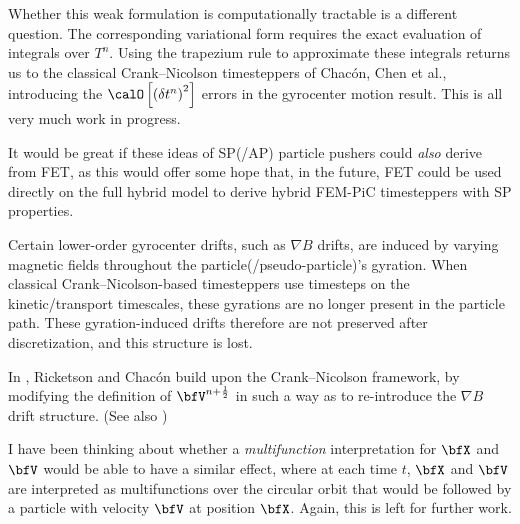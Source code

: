 \begin{remark}
        Whether this weak formulation is computationally tractable is a different question. The corresponding variational form requires the exact evaluation of integrals over $T^{n}$. Using the trapezium rule to approximate these integrals returns us to the classical Crank--Nicolson timesteppers of Chacón, Chen et al., introducing the $\calO\left[\left(\delta t^{n}\right)^{2}\right]$ errors in the gyrocenter motion result. This is all very much work in progress.

        It would be great if these ideas of SP(/AP) particle pushers could \emph{also} derive from FET, as this would offer some hope that, in the future, FET could be used directly on the full hybrid model to derive hybrid FEM-PiC timesteppers with SP properties.
    \end{remark}

    \begin{remark}
        Certain lower-order gyrocenter drifts, such as $\nabla B$ drifts, are induced by varying magnetic fields throughout the particle(/pseudo-particle)'s gyration. When classical Crank--Nicolson-based timesteppers use timesteps on the kinetic/transport timescales, these gyrations are no longer present in the particle path. These gyration-induced drifts therefore are not preserved after discretization, and this structure is lost.
        
        In \cite{Ricketson_Chacón_2020}, Ricketson and Chacón build upon the Crank--Nicolson framework, by modifying the definition of $\bfV^{n + \frac{1}{2}}$ in such a way as to re-introduce the $\nabla B$ drift structure. (See also \cite{Koshkarov_et_al_2022})

        I have been thinking about whether a \emph{multifunction} interpretation for $\bfX$ and $\bfV$ would be able to have a similar effect, where at each time $t$, $\bfX$ and $\bfV$ are interpreted as multifunctions over the circular orbit that would be followed by a particle with velocity $\bfV$ at position $\bfX$. Again, this is left for further work.
    \end{remark}
